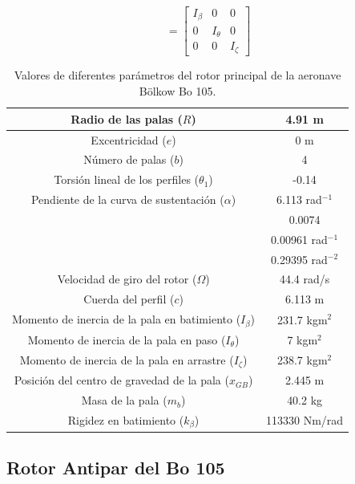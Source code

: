 \begin{equation}
[I_B]=\left[	
\begin{array}{ccc}
I_\beta & 0 & 0\\
0 & I_\theta & 0\\
0 & 0 & I_\zeta
\end{array}
\right]
\end{equation}

\begin{table}[]
	\centering
	\begin{tabular}{|>{\columncolor{Gray}}c|c|}
		\hline
		Radio de las palas ($R$) & 4.91 m \\ \hline
		Excentricidad ($e$) & 0 m \\ \hline
		Número de palas ($b$) & 4 \\ \hline
		Torsión lineal de los perfiles ($\theta_1$) & -0.14 \\ \hline
		Pendiente de la curva de sustentación ($\alpha$) & 6.113 rad$^{-1}$ \\ \hline
		\cellcolor{Gray} & 0.0074 \\ \cline{2-2} 
		\cellcolor{Gray} & 0.00961 rad$^{-1}$ \\ \cline{2-2} 
		\multirow{-3}{*}{\cellcolor{Gray}Parámetros de la polar ($\delta_0$, $\delta_1$, $\delta_2$)} & 0.29395 rad$^{-2}$ \\ \hline
		Velocidad de giro del rotor ($\Omega$) & 44.4 rad/s \\ \hline
		Cuerda del perfil ($c$) & 6.113 m \\ \hline
		Momento de inercia de la pala en batimiento ($I_\beta$) & 231.7 kgm$^2$ \\ \hline
		Momento de inercia de la pala en paso ($I_\theta$) & 7 kgm$^2$ \\ \hline
		Momento de inercia de la pala en arrastre ($I_\zeta$) & 238.7 kgm$^2$ \\ \hline
		Posición del centro de gravedad de la pala ($x_{GB}$) & 2.445 m \\ \hline
		Masa de la pala ($m_b$) & 40.2 kg \\ \hline
		Rigidez en batimiento ($k_\beta$) & 113330 Nm/rad \\ \hline
	\end{tabular}
	\caption{Valores de diferentes parámetros del rotor principal de la aeronave Bölkow Bo 105.}
	\label{RPBo}
\end{table}

\subsection{Rotor Antipar del Bo 105}

